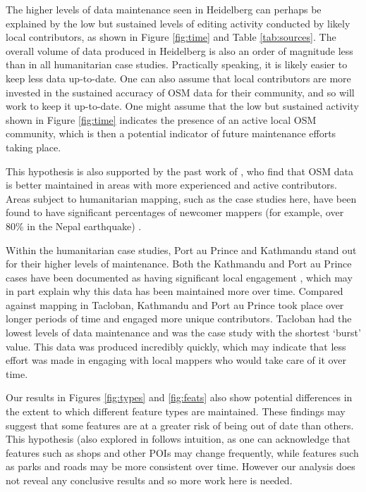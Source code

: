 The higher levels of data maintenance seen in Heidelberg can perhaps be explained by the low but sustained levels of editing activity conducted by likely local contributors, as shown in Figure \ref{fig:time} and Table \ref{tab:sources}. The overall volume of data produced in Heidelberg is also an order of magnitude less than in all humanitarian case studies. Practically speaking, it is likely easier to keep less data up-to-date. One can also assume that local contributors are more invested in the sustained accuracy of OSM data for their community, and so will work to keep it up-to-date. One might assume that the low but sustained activity shown in Figure \ref{fig:time} indicates the presence of an active local OSM community, which is then a potential indicator of future maintenance efforts taking place. 

This hypothesis is also supported by the past work of  \textcite{quattrone_work_2017}, who find that OSM data is better maintained in areas with more experienced and active contributors. Areas subject to humanitarian mapping, such as the case studies here, have been found to have significant percentages of newcomer mappers (for example, over 80\% in the Nepal earthquake) \parencite{dittus_mass_2017}. 

Within the humanitarian case studies, Port au Prince and Kathmandu stand out for their higher levels of maintenance. Both the Kathmandu and Port au Prince cases have been documented as having significant local engagement \parencite{soden_crowdsourced_2014}, which may in part explain why this data has been maintained more over time. Compared against mapping in Tacloban, Kathmandu and Port au Prince took place over longer periods of time and engaged more unique contributors. Tacloban had the lowest levels of data maintenance and was the case study with the shortest ‘burst’ value. This data was produced incredibly quickly, which may indicate that less effort was made in engaging with local mappers who would take care of it over time. 

Our results in Figures \ref{fig:types} and \ref{fig:feats} also show potential differences in the extent to which different feature types are maintained. These findings may suggest that some features are at a greater risk of being out of date than others. This hypothesis (also explored in \textcite{quattrone_work_2017} follows intuition, as one can acknowledge that features such as shops and other POIs may change frequently, while features such as parks and roads may be more consistent over time. However our analysis does not reveal any conclusive results and so more work here is needed. 

